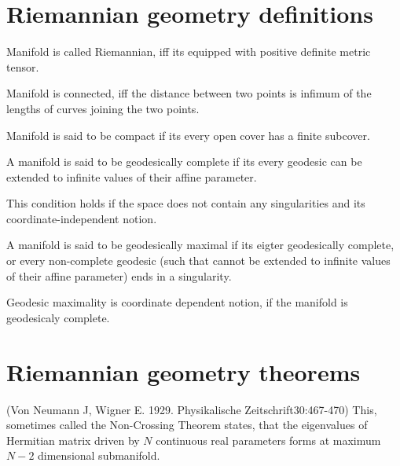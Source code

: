 \section{Riemannian geometry definitions}
\begin{definition}
    Manifold is called Riemannian, iff its equipped with positive definite metric tensor.
\end{definition}
\begin{definition}
    Manifold is connected, iff the distance between two points is infimum of the lengths of curves joining the two points.
\end{definition}
\begin{definition}
    Manifold is said to be compact if its every open cover has a finite subcover.
\end{definition}
\begin{definition}
    A manifold is said to be geodesically complete if its every geodesic can be extended to infinite values of their affine parameter. 
\end{definition}
This condition holds if the space does not contain any singularities and its coordinate-independent notion.
\begin{definition}
    A manifold is said to be geodesically maximal if its eigter geodesically complete, or every non-complete geodesic (such that cannot be extended to infinite values of their affine parameter) ends in a singularity.
\end{definition}
Geodesic maximality is coordinate dependent notion, if the manifold is geodesicaly complete.


\section{Riemannian geometry theorems}

\begin{thm}
    \label{thm:n-2}
(Von Neumann J, Wigner E. 1929. Physikalische Zeitschrift30:467-470)
This, sometimes called the Non-Crossing Theorem states, that the eigenvalues of Hermitian matrix driven by $N$ continuous real parameters forms at maximum $N-2$ dimensional submanifold.
\end{thm}


